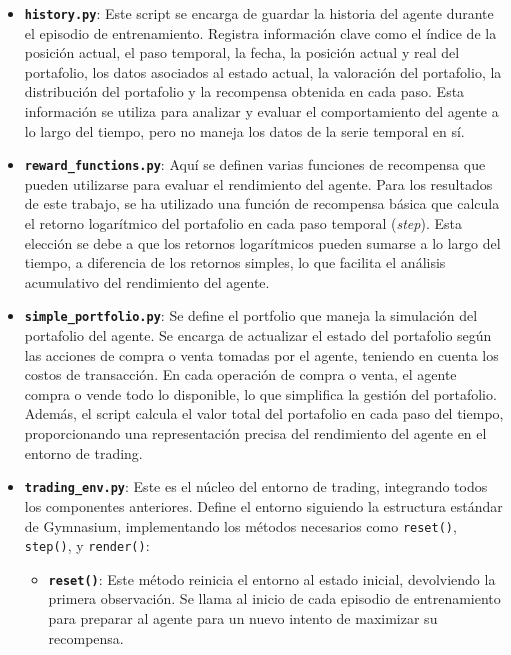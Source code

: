 \documentclass[a4paper,12pt]{report}
\begin{document}
\begin{itemize}
    \item \textbf{\texttt{history.py}}: Este script se encarga de guardar la historia del agente durante el episodio de entrenamiento. Registra información clave como el índice de la posición actual, el paso temporal, la fecha, la posición actual y real del portafolio, los datos asociados al estado actual, la valoración del portafolio, la distribución del portafolio y la recompensa obtenida en cada paso. Esta información se utiliza para analizar y evaluar el comportamiento del agente a lo largo del tiempo, pero no maneja los datos de la serie temporal en sí.

    \item \textbf{\texttt{reward\_functions.py}}: Aquí se definen varias funciones de recompensa que pueden utilizarse para evaluar el rendimiento del agente. Para los resultados de este trabajo, se ha utilizado una función de recompensa básica que calcula el retorno logarítmico del portafolio en cada paso temporal (\textit{step}). Esta elección se debe a que los retornos logarítmicos pueden sumarse a lo largo del tiempo, a diferencia de los retornos simples, lo que facilita el análisis acumulativo del rendimiento del agente.

    \item \textbf{\texttt{simple\_portfolio.py}}: Se define el portfolio que maneja la simulación del portafolio del agente. Se encarga de actualizar el estado del portafolio según las acciones de compra o venta tomadas por el agente, teniendo en cuenta los costos de transacción. En cada operación de compra o venta, el agente compra o vende todo lo disponible, lo que simplifica la gestión del portafolio. Además, el script calcula el valor total del portafolio en cada paso del tiempo, proporcionando una representación precisa del rendimiento del agente en el entorno de trading.

    \item \textbf{\texttt{trading\_env.py}}: Este es el núcleo del entorno de trading, integrando todos los componentes anteriores. Define el entorno siguiendo la estructura estándar de Gymnasium, implementando los métodos necesarios como \texttt{reset()}, \texttt{step()}, y \texttt{render()}:

    \begin{itemize}
        \item \textbf{\texttt{reset()}}: Este método reinicia el entorno al estado inicial, devolviendo la primera observación. Se llama al inicio de cada episodio de entrenamiento para preparar al agente para un nuevo intento de maximizar su recompensa.
        

\end{itemize}
\end{itemize}
\end{document}
